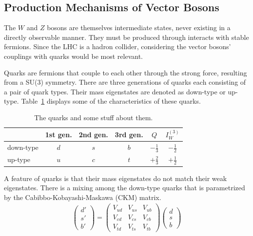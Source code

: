 \subsection{Production Mechanisms of Vector Bosons} \label{sec:produce-vector}

The $W$ and $Z$ bosons are themselves intermediate states,
never existing in a directly observable manner.
They must be produced through interacts with stable fermions.
Since the LHC is a hadron collider,
considering the vector bosons' couplings with quarks would be most relevant.

Quarks are fermions that couple to each other through the strong force,
resulting from a SU(3) symmetry.
There are three generations of quarks each consisting of a pair of quark types.
Their mass eigenstates are denoted as down-type or up-type.
Table~\ref{tab:quarks} displays some of the characteristics of these quarks.
\begin{table}
  \centering
  \caption[Quark flavors]{The quarks and some stuff about them.}
  {\renewcommand{\arraystretch}{1.5}
  \begin{tabular}{|l|c c c c c|}
    \hline
    & 1st gen. & 2nd gen. & 3rd gen. & $Q$ & $I_W^{(3)}$ \\
    \hline
    down-type & $d$ & $s$ & $b$ & $-\frac13$ & $-\frac12$ \\
    up-type & $u$ & $c$ & $t$ & $+\frac23$ & $+\frac12$ \\
    \hline
  \end{tabular}}
  \label{tab:quarks}
\end{table}
A feature of quarks is that their mass eigenstates do not match their weak eigenstates.
There is a mixing among the down-type quarks that is parametrized by the
Cabibbo-Kobayashi-Maskawa (CKM) matrix.
\begin{gather}
  \left(
  \begin{matrix}
    d' \\
    s' \\
    b'
  \end{matrix}
  \right)
  =
  \left(
  \begin{matrix}
    V_{ud} & V_{us} & V_{ub} \\
    V_{cd} & V_{cs} & V_{cb} \\
    V_{td} & V_{ts} & V_{tb}
  \end{matrix}
  \right)
  \left(
  \begin{matrix}
    d \\
    s \\
    b
  \end{matrix}
  \right)
\end{gather}

